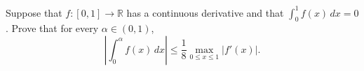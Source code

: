 Suppose that $f: [0,1] \to \mathbb{R}$ has a continuous derivative
and that $\int_0^1 f(x)\,dx = 0$. Prove that for every $\alpha \in (0,1)$,
\[
\left| \int_0^\alpha f(x)\,dx \right| \leq \frac{1}{8} \max_{0 \leq x
\leq 1} |f'(x)|.
\]
